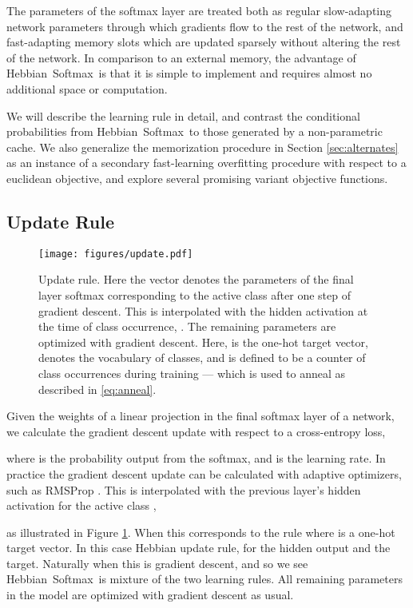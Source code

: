 \documentclass{article} \usepackage{hyperref}
\newcommand{\model}{\hbox{Hebbian Softmax }}
\begin{document}
The parameters of the softmax layer are treated both as regular slow-adapting network parameters through which gradients flow to the rest of the network, and fast-adapting memory slots which are updated sparsely without altering the rest of the network. In comparison to an external memory, the advantage of \model is that it is simple to implement and requires almost no additional space or computation.

We will describe the learning rule in detail, and contrast the conditional probabilities from \model to those generated by a non-parametric cache. We also generalize the memorization procedure in Section \ref{sec:alternates} as an instance of a secondary fast-learning overfitting procedure with respect to a euclidean objective, and explore several promising variant objective functions. 
\subsection{Update Rule}
\begin{figure}
    \centering
    \texttt{[image: figures/update.pdf]}
    \caption{Update rule. Here the vector  denotes the parameters  of the final layer softmax corresponding to the active class  after one step of gradient descent. This is interpolated with the hidden activation at the time of class occurrence, . The remaining parameters are optimized with gradient descent. Here,  is the one-hot target vector,  denotes the vocabulary of classes, and  is defined to be a counter of class occurrences during training --- which is used to anneal  as described in \eqref{eq:anneal}. }
    \label{fig:update}
\end{figure}
Given the weights of a linear projection  in the final softmax layer of a network, we calculate the gradient descent update with respect to a cross-entropy loss,

where  is the probability output from the softmax, and  is the learning rate. In practice the gradient descent update  can be calculated with adaptive optimizers, such as RMSProp \citep{tieleman2012lecture}. This is interpolated with the previous layer's hidden activation  for the active class ,

as illustrated in Figure \ref{fig:update}. When  this corresponds to the rule  where  is a one-hot target vector. In this case Hebbian update rule,  for  the hidden output and  the target. Naturally when  this is gradient descent, and so we see \model is mixture of the two learning rules. All remaining parameters in the model are optimized with gradient descent as usual. 
\end{document}
